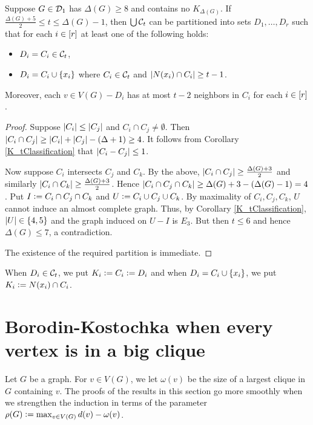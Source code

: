 \begin{lem}\label{partition}
Suppose $G \in \mathcal{D}_1$ has $\Delta(G) \geq 8$ and contains no $K_{\Delta(G)}$. If
$\frac{\Delta(G) + 5}{2} \leq t \leq \Delta(G) - 1$, then $\bigcup \mathcal{C}_t$ can be
partitioned into sets $D_1, \ldots, D_r$ such that for each $i \in \left[r\right]$
at least one of the following holds:
\begin{itemize}
  \item $D_i = C_i \in \mathcal{C}_t$,
  \item $D_i = C_i \cup \left\{ x_i \right\}$ where $C_i \in \mathcal{C}_t$ and $\left|N(x_i) \cap
  C_i\right| \geq t-1$.
\end{itemize}

\noindent Moreover, each $v \in V(G) - D_i$ has at most $t-2$ neighbors in $C_i$  for each $i \in \left[r\right]$.
\end{lem}
\begin{proof}
Suppose $\left|C_i\right| \leq \left|C_j\right|$ and $C_i \cap C_j \neq \emptyset$. 
Then $\left|C_i \cap C_j\right| \geq \left|C_i\right| + \left|C_j\right| - (\Delta + 1) \geq 4$.  It follows from Corollary
\ref{K_tClassification} that $\left|C_i - C_j\right| \leq 1$.

Now suppose $C_i$ intersects $C_j$ and $C_k$.  By the above,
$\left|C_i \cap C_j\right| \geq \frac{\Delta(G) + 3}{2}$ and similarly $\left|C_i \cap
C_k\right| \geq \frac{\Delta(G) + 3}{2}$.  Hence $\left|C_i \cap C_j \cap C_k\right| \geq
\Delta(G) + 3 - (\Delta(G) - 1) = 4$.  Put $I \mathrel{\mathop:}= C_i \cap C_j \cap C_k$
and $U \mathrel{\mathop:}= C_i \cup C_j \cup C_k$.  By maximality of $C_i, C_j, C_k$,
$U$ cannot induce an almost complete graph.  Thus, by Corollary
\ref{K_tClassification}, $\left|U\right| \in \left\{ 4, 5 \right\}$ and the graph induced on $U -
I$ is $E_3$.  But then $t \leq 6$ and hence $\Delta(G) \leq 7$, a contradiction.

\smallskip

\noindent The existence of the required partition is immediate. 
\end{proof}

\noindent When $D_i \in \mathcal{C}_t$, we put $K_i \mathrel{\mathop:}= C_i \mathrel{\mathop:}= D_i$ and
when $D_i = C_i \cup \left\{ x_i \right\}$, we put $K_i \mathrel{\mathop:}= N(x_i) \cap C_i$.

\section{Borodin-Kostochka when every vertex is in a big clique}
Let $G$ be a graph.  For $v \in V(G)$, we let $\omega(v)$ be the size of a
largest clique in $G$ containing $v$.  The proofs of the results in this section
go more smoothly when we strengthen the induction in terms of the parameter
$\rho(G) \mathrel{\mathop:}= \max_{v \in V(G)} d(v) - \omega(v)$.

